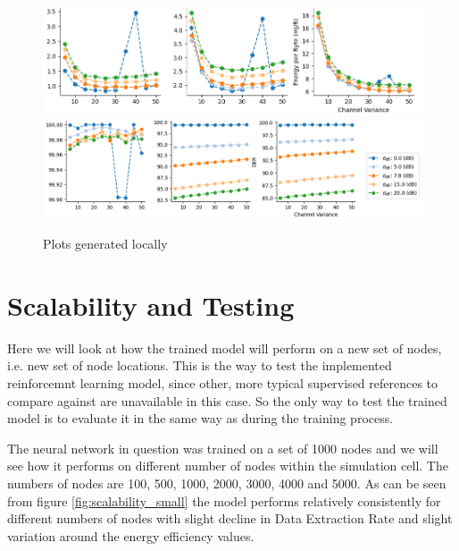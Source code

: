 \begin{figure}[H]
\centering
\includegraphics[scale=0.5]{figures/my_plots_1.PNG}\\
\hspace*{1.3cm}  
\includegraphics[scale=0.5]{figures/my_plots_2.PNG}
  \caption{Plots generated locally}
  \label{fig:my_sectors}
\end{figure}

\section{Scalability and Testing}
Here we will look at how the trained model will perform on a new set
of nodes, i.e. new set of node locations. This is the way to test the 
implemented reinforcemnt learning model, since other, more typical
supervised references to compare against are unavailable in this case.
So the only way to test the trained model is to evaluate it in 
the same way as during the training process. 

The neural network in question was trained on a set of 1000 nodes and 
we will see how it performs on different number of nodes within the 
simulation cell. The numbers of nodes are 100, 500, 1000, 2000, 3000,
4000 and 5000. As can be seen from figure \ref{fig:scalability_small} the model performs relatively consistently for different numbers of nodes with slight decline in Data Extraction Rate
and slight variation around the energy efficiency values. 

